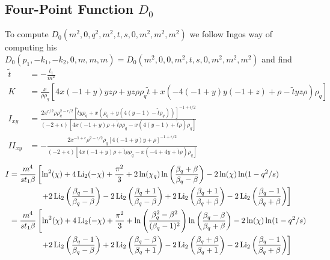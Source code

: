 \subsection[Four-Point Function D0]{Four-Point Function $D_0$}
To compute $D_0(m^2,0,q^2,m^2,t,s,0,m^2,m^2,m^2)$ we follow Ingos way\cite{Bojak:2000eu} of computing his $D_0(p_1,-k_1,-k_2,0,m,m,m)=D_0(m^2,0,0,m^2,t,s,0,m^2,m^2,m^2)$ and find
\begin{align}
\tilde t &= -\frac{t_1}{m^2}\\
K &= \frac x {\rho \rho_q}\left[4 x (-1+y) y z \rho+yz \rho\rho_q\tilde t +x (-4 (-1+y) y (-1+z)+\rho-\tilde t y z \rho) \rho_q\right]\\
I_{xy} &= \frac{2 x^{\epsilon/2} \rho\rho_q^{2-\epsilon/2} \left[\tilde t y \rho_q+x (\rho_q+y (4 (y-1)-\tilde t \rho_q))\right]^{-1+\epsilon/2}}{(-2+\epsilon) \left[4 x (-1+y) \rho+\tilde t \rho \rho_q-x (4(y-1)+\tilde t \rho) \rho_q\right]}\\
II_{xy} &= -\frac{2 x^{-1+\epsilon} \rho^{2-\epsilon/2} \rho_q \left[4 (-1+y) y+\rho\right]^{-1+\epsilon/2} }{(-2+\epsilon) \left[4 x (-1+y) \rho+\tilde t \rho \rho_q-x (-4+4 y+\tilde t \rho) \rho_q\right]}
\end{align}
\begin{align}
I &= \frac{m^4}{s t_1 \beta}\left[\ln^2(\chi)+4\operatorname{\text{Li}_2}(-\chi)+\frac{\pi^2}3 +2\ln(\chi_q)\ln\left(\frac{\beta_q+\beta}{\beta_q-\beta}\right)-2\ln(\chi)\ln(1-q^2/s)\right.\nonumber\\
 &\hspace{40pt}\left. + 2\operatorname{\text{Li}_2}\left(\frac{\beta_q-1}{\beta_q-\beta}\right)-2\operatorname{\text{Li}_2}\left(\frac{\beta_q+1}{\beta_q-\beta}\right)+2\operatorname{\text{Li}_2}\left(\frac{\beta_q+1}{\beta_q+\beta}\right)-2\operatorname{\text{Li}_2}\left(\frac{\beta_q-1}{\beta_q+\beta}\right) \right]\\
&= \frac{m^4}{s t_1 \beta}\left[\ln^2(\chi)+4\operatorname{\text{Li}_2}(-\chi)+\frac{\pi^2}3 +\ln\left(\frac{\beta_q^2-\beta^2}{(\beta_q-1)^2}\right)\ln\left(\frac{\beta_q-\beta}{\beta_q+\beta}\right)-2\ln(\chi)\ln(1-q^2/s)\right.\nonumber\\
 &\hspace{40pt}\left. + 2\operatorname{\text{Li}_2}\left(\frac{\beta_q-1}{\beta_q-\beta}\right)+2\operatorname{\text{Li}_2}\left(\frac{\beta_q-\beta}{\beta_q+1}\right)-2\operatorname{\text{Li}_2}\left(\frac{\beta_q+\beta}{\beta_q+1}\right)-2\operatorname{\text{Li}_2}\left(\frac{\beta_q-1}{\beta_q+\beta}\right) \right]
\end{align}
